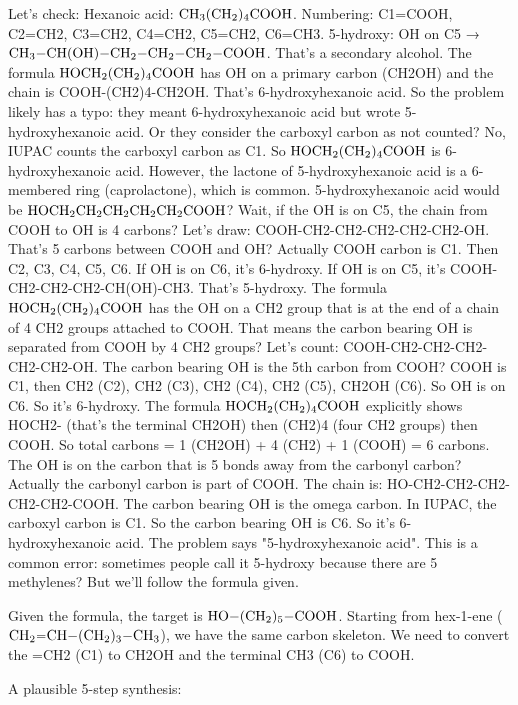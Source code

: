 \documentclass[11pt]{article}
\begin{document}
\begin{corrige}
Let's check: Hexanoic acid: \(\ce{CH3(CH2)4COOH}\). Numbering: C1=COOH, C2=CH2, C3=CH2, C4=CH2, C5=CH2, C6=CH3. 5-hydroxy: OH on C5 → \(\ce{CH3-CH(OH)-CH2-CH2-CH2-COOH}\). That's a secondary alcohol. The formula \(\ce{HOCH2(CH2)4COOH}\) has OH on a primary carbon (CH2OH) and the chain is COOH-(CH2)4-CH2OH. That's 6-hydroxyhexanoic acid. So the problem likely has a typo: they meant 6-hydroxyhexanoic acid but wrote 5-hydroxyhexanoic acid. Or they consider the carboxyl carbon as not counted? No, IUPAC counts the carboxyl carbon as C1. So \(\ce{HOCH2(CH2)4COOH}\) is 6-hydroxyhexanoic acid. However, the lactone of 5-hydroxyhexanoic acid is a 6-membered ring (caprolactone), which is common. 5-hydroxyhexanoic acid would be \(\ce{HOCH2CH2CH2CH2CH2COOH}\)? Wait, if the OH is on C5, the chain from COOH to OH is 4 carbons? Let's draw: COOH-CH2-CH2-CH2-CH2-CH2-OH. That's 5 carbons between COOH and OH? Actually COOH carbon is C1. Then C2, C3, C4, C5, C6. If OH is on C6, it's 6-hydroxy. If OH is on C5, it's COOH-CH2-CH2-CH2-CH(OH)-CH3. That's 5-hydroxy. The formula \(\ce{HOCH2(CH2)4COOH}\) has the OH on a CH2 group that is at the end of a chain of 4 CH2 groups attached to COOH. That means the carbon bearing OH is separated from COOH by 4 CH2 groups? Let's count: COOH-CH2-CH2-CH2-CH2-CH2-OH. The carbon bearing OH is the 5th carbon from COOH? COOH is C1, then CH2 (C2), CH2 (C3), CH2 (C4), CH2 (C5), CH2OH (C6). So OH is on C6. So it's 6-hydroxy. The formula \(\ce{HOCH2(CH2)4COOH}\) explicitly shows HOCH2- (that's the terminal CH2OH) then (CH2)4 (four CH2 groups) then COOH. So total carbons = 1 (CH2OH) + 4 (CH2) + 1 (COOH) = 6 carbons. The OH is on the carbon that is 5 bonds away from the carbonyl carbon? Actually the carbonyl carbon is part of COOH. The chain is: HO-CH2-CH2-CH2-CH2-CH2-COOH. The carbon bearing OH is the omega carbon. In IUPAC, the carboxyl carbon is C1. So the carbon bearing OH is C6. So it's 6-hydroxyhexanoic acid. The problem says "5-hydroxyhexanoic acid". This is a common error: sometimes people call it 5-hydroxy because there are 5 methylenes? But we'll follow the formula given.

Given the formula, the target is \(\ce{HO-(CH2)5-COOH}\). Starting from hex-1-ene (\(\ce{CH2=CH-(CH2)3-CH3}\)), we have the same carbon skeleton. We need to convert the =CH2 (C1) to CH2OH and the terminal CH3 (C6) to COOH.

A plausible 5-step synthesis:


\end{corrige}
\end{document}

